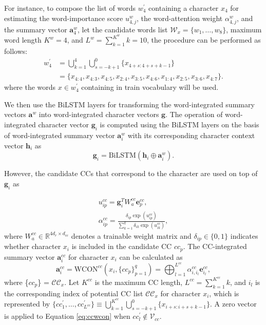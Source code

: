 For instance, to compose the list of words $w^{\prime}_{4}$ containing a character $x_{4}$ for estimating the word-importance score $u^{w}_{4,j}$, the word-attention weight $\alpha^{w}_{4,j}$, and the summary vector $\textbf{a}^{w}_{4}$, let the candidate words list $\mathcal{W}_{x} = \{w_{1},\dots,w_{8}\}$, maximum word length $K^{w} = 4$, and $L^{w} = \sum_{k=1}^{K^{w }}k = 10$, the procedure can be performed as follows:
%
\begin{equation}
    \begin{split}
        w^{\prime}_{4} &= \bigcup_{k=1}^{4}\bigcup_{s=-k+1}^{0} \{x_{4+s:4+s+k-1}\} \\
        & = \{x_{4:4},x_{4:3},x_{4:5},x_{2:4},x_{3:5},x_{4:6},x_{1:4},x_{2:5},x_{3:6},x_{4:7}\}.
    \end{split}
    \label{eq:wcon-x4}
\end{equation}
where the words $x \in w^{\prime}_{4}$ containing in train vocabulary will be used.
%

We then use the BiLSTM layers for transforming the word-integrated summary vectors $\textbf{a}^{w}$ into word-integrated character vectors $\textbf{g}$. 
%
The operation of word-integrated character vector $\textbf{g}_{i}$ is computed using the BiLSTM layers on the basis of word-integrated summary vector $\textbf{a}_{i}^{w}$ with its corresponding character context vector $\textbf{h}_{i}$ as 
%
\begin{equation}
    \textbf{g}_{i} = \text{BiLSTM}(\textbf{h}_{i}\oplus\textbf{a}_{i}^{w}).
    \label{eq:wcon-concat}
\end{equation}
%

However, the candidate CCs that correspond to the character are used on top of $\textbf{g}_{i}$ as
%

\begin{gather}
    u_{ip}^{cc} = \textbf{g}_i^{T}W_{a}^{cc}\textbf{e}_{p}^{cc}, \label{eq:ccwcon-score}\\
    \alpha_{ip}^{cc} = \frac{\delta_{ip}\exp(u_{ip}^{cc})}{\sum_{k=1}^{q}\delta_{ik}\exp(u_{ik}^{cc})},
\end{gather}
%
where $W_{a}^{cc} \in \mathbb{R}^{4d_{r} \times d_{cc}}$ denotes a trainable weight matrix and $\delta_{ip} \in \{0,1\}$ indicates whether character $x_{i}$ is included in the candidate CC $cc_{p}$.
%
The CC-integrated summary vector $\textbf{a}_{i}^{cc}$ for character $x_{i}$ can be calculated as
\begin{equation}
    \textbf{a}_{i}^{cc} = \text{WCON}^{cc}(x_{i}, \{cc_{p}\}_{p=1}^{q}) {=} \bigoplus_{l=1}^{L^{cc}}\alpha_{i,i_{l}}^{cc}\textbf{e}_{i_{l}}^{cc},
    \label{eq:ccwcon}
\end{equation}
%
where \{$cc_{p}$\} = $\mathcal{CC}_{x}$. 
%
Let $K^{cc}$ is the maximum CC length, $L^{cc} = \sum_{k=1}^{K^{cc}}k$, and $i_{l}$ is the corresponding index of potential CC list $\mathcal{CC}_{x}$ for character $x_{i}$, which is represented by $\{cc^{\prime}_{1},\dots,cc^{\prime}_{L^{cc}}\} \equiv \bigcup_{k=1}^{K^{cc}}\bigcup_{s=-k+1}^{0}\{x_{i+s:i+s+k-1}\}$.
%
A zero vector is applied to Equation \ref{eq:ccwcon} when $cc^{\prime}_{l} \notin \mathcal{V}_{cc}$.

